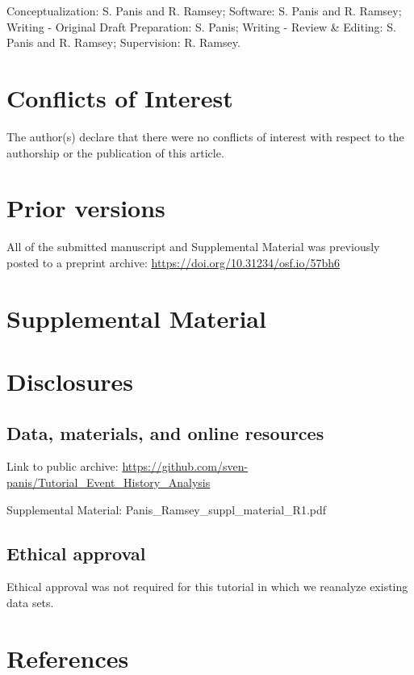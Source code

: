 \documentclass[
  man, donotrepeattitle,floatsintext]{apa6}
\begin{document}
Conceptualization: S. Panis and R. Ramsey; Software: S. Panis and R. Ramsey; Writing - Original Draft Preparation: S. Panis; Writing - Review \& Editing: S. Panis and R. Ramsey; Supervision: R. Ramsey.

\section{Conflicts of Interest}\label{conflicts-of-interest}

The author(s) declare that there were no conflicts of interest with respect to the authorship or the publication of this article.

\section{Prior versions}\label{prior-versions}

All of the submitted manuscript and Supplemental Material was previously posted to a preprint archive: \url{https://doi.org/10.31234/osf.io/57bh6}

\section{Supplemental Material}\label{supplemental-material}

\section{Disclosures}\label{disclosures}

\subsection{Data, materials, and online resources}\label{data-materials-and-online-resources}

Link to public archive: \url{https://github.com/sven-panis/Tutorial_Event_History_Analysis}

Supplemental Material: Panis\_Ramsey\_suppl\_material\_R1.pdf

\subsection{Ethical approval}\label{ethical-approval}

Ethical approval was not required for this tutorial in which we reanalyze existing data sets.

\newpage

\section{References}\label{references}
\end{document}
